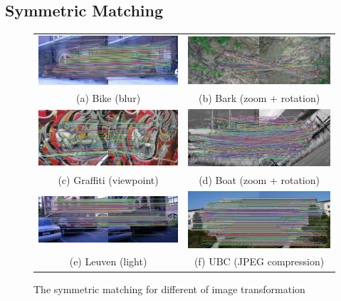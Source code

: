 \subsection {Symmetric Matching}
\begin{figure}[H]
\begin{tabular}{cc}
  \includegraphics[width=75mm]{figures/bike_sym_1_3} &  \includegraphics[width=75mm]{figures/barks_sym_1_3} \\
(a) Bike (blur) & (b) Bark (zoom + rotation) \\[6pt]
 \includegraphics[width=75mm]{figures/graffiti_sym_1_3} &  \includegraphics[width=75mm]{figures/boat_sym_1_3} \\
(c) Graffiti (viewpoint) & (d) Boat (zoom + rotation) \\[6pt]
 \includegraphics[width=75mm]{figures/leuven_sym_1_3} &  \includegraphics[width=75mm]{figures/ubc_sym_1_3} \\
(e) Leuven (light) & (f) UBC (JPEG compression) \\[6pt]
\end{tabular}
\caption{The symmetric matching for different of image transformation}\label{fig:symmetric_matching}
\end{figure}

